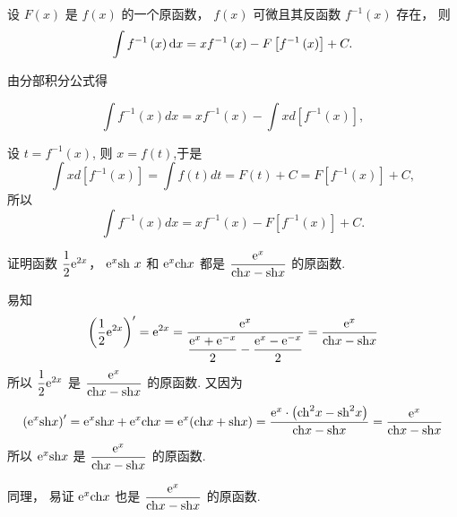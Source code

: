 
\begin{problem}
	设 \(F\left( x \right)\) 是 \(f(x)\) 的一个原函数，
\(f\left( x \right)\) 可微且其反函数 \(f^{- 1}\left( x \right)\) 存在，
则$$\int f^{- 1}\left( x \right)\mathop{}\!\mathrm{d} x = xf^{- 1}\left( x \right) - F\left\lbrack f^{- 1}\left( x \right) \right\rbrack + C.$$

\begin{solution}
由分部积分公式得

$$\int f^{- 1}\left( x \right)dx = xf^{- 1}\left( x \right) - \int xd\left\lbrack f^{- 1}\left( x \right) \right\rbrack,$$

设 \(t = f^{- 1}\left( x \right)\), 则 \(x = f\left( t \right)\),于是
$$\int xd\left\lbrack f^{- 1}\left( x \right) \right\rbrack = \int f\left( t \right)dt= F\left( t \right) + C = F\left\lbrack f^{- 1}\left( x \right) \right\rbrack + C,$$
所以
$$\int f^{- 1}(x)dx = xf^{- 1}(x) - F\left\lbrack f^{- 1}(x) \right\rbrack + C.$$
\end{solution}
\end{problem}

\begin{problem}
	证明函数 \(\dfrac{1}{2}\mathrm{e}^{2x}\)， \(\mathrm{e}^{x}{\mathrm{sh}\ }x\) 和 \(\mathrm{e}^{x}{\mathrm{ch}}x\)
都是 \(\dfrac{\mathrm{e}^{x}}{\mathrm{ch}x - \mathrm{sh}x}\) 的原函数.

\begin{solution}
	易知
	$$ \left( \dfrac{1}{2}\mathrm{e}^{2x} \right)' = \mathrm{e}^{2x} = \dfrac{\mathrm{e}^{x}}{\dfrac{\mathrm{e}^{x} + \mathrm{e}^{- x}}{2} - \dfrac{\mathrm{e}^{x} - \mathrm{e}^{- x}}{2}} = \frac{\mathrm{e}^{x}}{\mathrm{ch}x - \mathrm{sh}x}$$
所以
\(\dfrac{1}{2}\mathrm{e}^{2x}\) 是 \(\dfrac{\mathrm{e}^{x}}{\mathrm{ch}x - \mathrm{sh}x}\)
的原函数. 又因为
$$\left( \mathrm{e}^{x}\mathrm{sh}x \right)' = \mathrm{e}^{x}\mathrm{sh}x + \mathrm{e}^{x}\mathrm{ch}x = \mathrm{e}^{x}(\mathrm{ch}x + \mathrm{sh}x)= \frac{\mathrm{e}^{x} \cdot \left( {\mathrm{ch}}^{2}x - {\mathrm{sh}}^{2}x \right)}{\mathrm{ch}x - \mathrm{sh}x} = \frac{\mathrm{e}^{x}}{\mathrm{ch}x - \mathrm{sh}x}$$
所以
\(\mathrm{e}^{x}\mathrm{sh}x\) 是 \(\dfrac{\mathrm{e}^{x}}{\mathrm{ch}x - \mathrm{sh}x}\) 的原函数.

同理， 易证 \(\mathrm{e}^{x}\mathrm{ch}x\) 也是 \(\dfrac{\mathrm{e}^{x}}{\mathrm{ch}x - \mathrm{sh}x}\) 的原函数.
\end{solution}
\end{problem}

